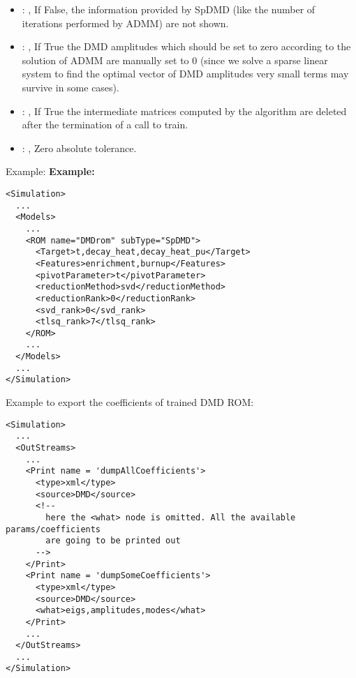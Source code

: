 \begin{itemize}
    \item {}: , 
      If False, the information provided by SpDMD (like the number of iterations performed
      by ADMM) are not shown.

    \item {}: , 
      If True the DMD amplitudes which should be set to zero
      according to the solution of ADMM are manually set to 0 (since we
      solve a sparse linear system to find the optimal vector of DMD amplitudes
      very small terms may survive in some cases).

    \item {}: , 
      If True the intermediate matrices computed by the algorithm are deleted
      after the termination of a call to train.

    \item {}: , 
      Zero absolute tolerance.
  \end{itemize}

\hspace{24pt}
Example:
\textbf{Example:}
\begin{lstlisting}[style=XML,morekeywords={name,subType}]
<Simulation>
  ...
  <Models>
    ...
    <ROM name="DMDrom" subType="SpDMD">
      <Target>t,decay_heat,decay_heat_pu</Target>
      <Features>enrichment,burnup</Features>
      <pivotParameter>t</pivotParameter>
      <reductionMethod>svd</reductionMethod>
      <reductionRank>0</reductionRank>
      <svd_rank>0</svd_rank>
      <tlsq_rank>7</tlsq_rank>
    </ROM>
    ...
  </Models>
  ...
</Simulation>
\end{lstlisting}

Example to export the coefficients of trained DMD ROM:
\begin{lstlisting}[style=XML,morekeywords={name,subType}]
<Simulation>
  ...
  <OutStreams>
    ...
    <Print name = 'dumpAllCoefficients'>
      <type>xml</type>
      <source>DMD</source>
      <!--
        here the <what> node is omitted. All the available params/coefficients
        are going to be printed out
      -->
    </Print>
    <Print name = 'dumpSomeCoefficients'>
      <type>xml</type>
      <source>DMD</source>
      <what>eigs,amplitudes,modes</what>
    </Print>
    ...
  </OutStreams>
  ...
</Simulation>
\end{lstlisting}


